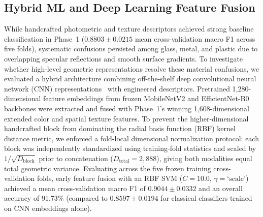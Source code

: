 
\subsection{Hybrid ML and Deep Learning Feature Fusion}
While handcrafted photometric and texture descriptors achieved strong baseline classification in Phase~1 ($0.8803\pm0.0215$ mean cross-validation macro F1 across five folds), systematic confusions persisted among glass, metal, and plastic due to overlapping specular reflections and smooth surface gradients. To investigate whether high-level geometric representations resolve these material confusions, we evaluated a hybrid architecture combining off-the-shelf deep convolutional neural network (CNN) representations~\cite{razavian2014cnn} with engineered descriptors. Pretrained 1,280-dimensional feature embeddings from frozen MobileNetV2 and EfficientNet-B0 backbones were extracted and fused with Phase~1's winning 1,608-dimensional extended color and spatial texture features. To prevent the higher-dimensional handcrafted block from dominating the radial basis function (RBF) kernel distance metric, we enforced a fold-local dimensional normalization protocol: each block was independently standardized using training-fold statistics and scaled by $1/\sqrt{D_{\mathrm{block}}}$ prior to concatenation ($D_{\mathrm{total}} = 2,888$), giving both modalities equal total geometric variance. Evaluating across the five frozen training cross-validation folds, early feature fusion with an RBF SVM ($C=10.0$, $\gamma=\text{`scale'}$) achieved a mean cross-validation macro F1 of $0.9044\pm0.0332$ and an overall accuracy of 91.73\% (compared to $0.8597\pm0.0194$ for classical classifiers trained on CNN embeddings alone). 

